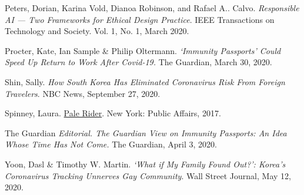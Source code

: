 \documentclass[11pt,dvipdfm]{article}
\begin{document}
\begin{thebibliography}{10}
\begin{small}
Peters, Dorian, Karina Vold, Dianoa Robinson, and Rafael A.. Calvo.  \emph{Responsible AI --- Two Frameworks for Ethical Design Practice}.  IEEE Transactions on Technology and Society.  Vol. 1, No. 1, March 2020.

Procter, Kate, Ian Sample \& Philip Oltermann.  \emph{‘Immunity Passports’ Could Speed Up Return to Work After Covid-19.}  The Guardian, March 30, 2020.

Shin, Sally.  \emph{How South Korea Has Eliminated Coronavirus Risk From Foreign Travelers}.  NBC News, September 27, 2020. 

Spinney, Laura.  \underline{Pale Rider}.  New York:  Public Affairs, 2017.

The Guardian \emph{Editorial.  The Guardian View on Immunity Passports:  An Idea Whose Time Has Not Come.}  The Guardian, April 3, 2020.

Yoon, Dasl \& Timothy W. Martin. \emph{‘What if My Family Found Out?’: Korea’s Coronavirus Tracking Unnerves Gay Community}.  Wall Street Journal, May 12, 2020. 

\end{small}
\end{thebibliography}
\end{document}

